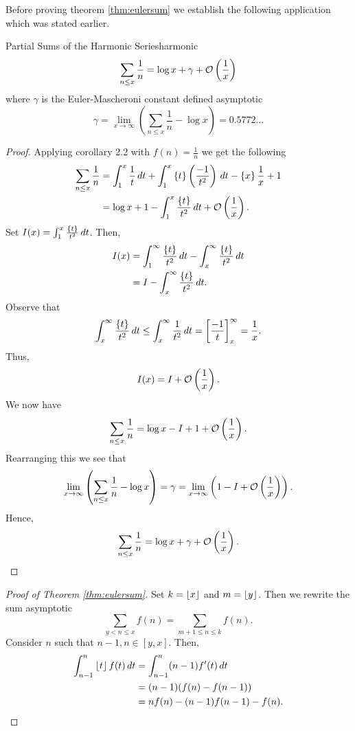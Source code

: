 \documentclass[twoside, openright, fontsize=10pt, headings=big]{scrbook}
\begin{document}
Before proving theorem \ref{thm:eulersum} we establish the following application which was stated earlier.
\begin{theorem}{Partial Sums of the Harmonic Series}{harmonic}
    \[
        \sum_{n\leq x}\frac{1}{n}=\log x +\gamma +\mathcal{O}\left(\frac{1}{x}\right)
    \]
    where $\gamma$ is the Euler-Mascheroni constant defined asymptotic
    \[
        \gamma=\lim_{x\to\infty}\left(\sum_{n\leq x}\frac{1}{n}-\log x\right)=0.5772\dots
    \]
\end{theorem}
\begin{proof}
    Applying corollary 2.2 with $f(n)=\frac{1}{n}$ we get the following
    \begin{align*}
        \sum_{n\leq x}\frac{1}{n}&=\int_{1}^{x}\frac{1}{t}\,dt+\int_{1}^{x}\left\{ t \right\}\left(\frac{-1}{t^2}\right)\,dt-\left\{ x \right\}\frac{1}{x}+1\\
        &=\log x +1 -\int_{1}^{x}\frac{\left\{ t \right\}}{t^2}\,dt+\mathcal{O}\left(\frac{1}{x}\right).
    \end{align*}
    Set $I(x)=\int_{1}^{x}\frac{\left\{ t \right\}}{t^2}\,dt$. Then,
    \begin{align*}
        I(x)&=\int_{1}^{\infty}\frac{\left\{ t \right\}}{t^2}\,dt-\int_{x}^{\infty}\frac{\left\{ t \right\}}{t^2}\,dt\\
        &=I-\int_{x}^{\infty}\frac{\left\{ t \right\}}{t^2}\,dt.
    \end{align*}    
    Observe that
    \[
        \int_{x}^{\infty}\frac{\left\{ t \right\}}{t^2}\,dt\leq \int_{x}^{\infty}\frac{1}{t^2}\,dt=\left[\frac{-1}{t}\right]^\infty_x=\frac{1}{x}.
    \]
    Thus,
    \[
        I(x)=I+\mathcal{O}\left(\frac{1}{x}\right).
    \]
    We now have
    \[
        \sum_{n\leq x}\frac{1}{n}=\log x -I + 1+\mathcal{O}\left(\frac{1}{x}\right).    
    \]
    Rearranging this we see that
    \[
    \operatorname*{lim}_{x\to\infty}\left(\sum_{n\leq x}\frac{1}{n}-\log x\right)=\gamma=\operatorname*{lim}_{x\to\infty}\left(1-I+\mathcal{O}\left(\frac{1}{x}\right)\right).
    \]
    Hence,
    \[
        \sum_{n\leq x}\frac{1}{n}=\log x +\gamma +\mathcal{O}\left(\frac{1}{x}\right). \qedhere
    \]
\end{proof}
\begin{proof}[Proof of Theorem \ref{thm:eulersum}]
    Set $k=\left\lfloor x \right\rfloor$ and $m=\left\lfloor y \right\rfloor$. Then we rewrite the sum asymptotic
    \[
        \sum_{y<n\leq x}f(n)=\sum_{m+1\leq n\leq k}f(n).
    \]
    Consider $n$ such that $n-1,n\in[y,x]$. Then,
    \begin{align*}
    \int_{n-1}^{n}\left\lfloor t \right\rfloor f(t)\,dt&=\int_{n-1}^{n}(n-1)f'(t)\,dt\\
    &=(n-1)(f(n)-f(n-1))\\
    &=nf(n)-(n-1)f(n-1)-f(n).\qedhere 
    \end{align*}
\end{proof}
\end{document}
